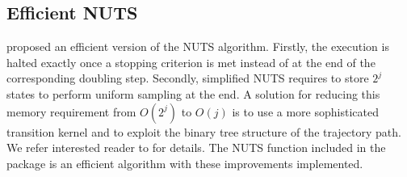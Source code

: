 \documentclass{article}
\begin{document}

\subsection{Efficient NUTS}
\par \citet{hoffman2014nuts} proposed an efficient version of the NUTS algorithm. Firstly, the execution is halted exactly once a stopping criterion is met instead of at the end of the corresponding doubling step. Secondly, simplified NUTS requires to store $2^j$ states to perform uniform sampling at the end. A solution for reducing this memory requirement from $O(2^j)$ to $O(j)$ is to use a more sophisticated transition kernel and to exploit the binary tree structure of the trajectory path. We refer interested reader to \citet{hoffman2014nuts} for details. The NUTS function included in the package is an efficient algorithm with these improvements implemented.

\end{document}

